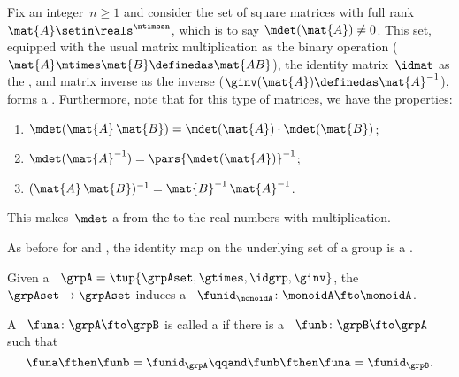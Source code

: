 \begin{example}
    \label{exa:square-full}
    Fix an integer~$n\geq1 $ and consider the set of square matrices with full rank~$\mat{A} \setin \reals^{\ntimesn}$, which is to say $\mdet(\mat{A}) \neq 0$.
    This set, equipped with the usual matrix multiplication as the binary operation ($\mat{A}\mtimes \mat{B}\definedas \mat{AB}$), the identity matrix~$\idmat$ as the , and matrix inverse as the inverse ($\ginv(\mat{A})\definedas \mat{A}^{-1}$), forms a .
    Furthermore, note that for this type of matrices, we have the properties:
    \begin{enumerate}
        \item $\mdet(\mat{A} \, \mat{B}) = \mdet(\mat{A}) \cdot \mdet(\mat{B})$;
        \item $\mdet(\mat{A}^{-1}) = \pars{ \mdet(\mat{A}) } ^ {-1}$;
        \item $(\mat{A}\,\mat{B})^{-1} = {\mat{B}^{-1} \, \mat{A}^{-1}}$.
    \end{enumerate}
    This makes~$\mdet$ a  from the  to the real numbers with multiplication.
\end{example}

As before for  and , the identity map on the underlying set of a group is a .

\begin{ctdefinition}
    \label{def:identity-grp-mor}
    Given a ~$\grpA = \tup{\grpAset, \gtimes, \idgrp, \ginv}$, the  $\grpAset \to \grpAset$ induces a ~$\funid_\monoidA\colon \monoidA \fto \monoidA$.
\end{ctdefinition}

\begin{ctdefinition}
    \label{def:group-isomorphism}
    A ~$\funa\colon \grpA \fto \grpB$ is called a  if there is a ~$\funb\colon \grpB \fto \grpA$ such that
    \begin{equation}
        \funa \fthen \funb = \funid_\grpA \qqand \funb \fthen \funa = \funid_\grpB.
    \end{equation}
\end{ctdefinition}


